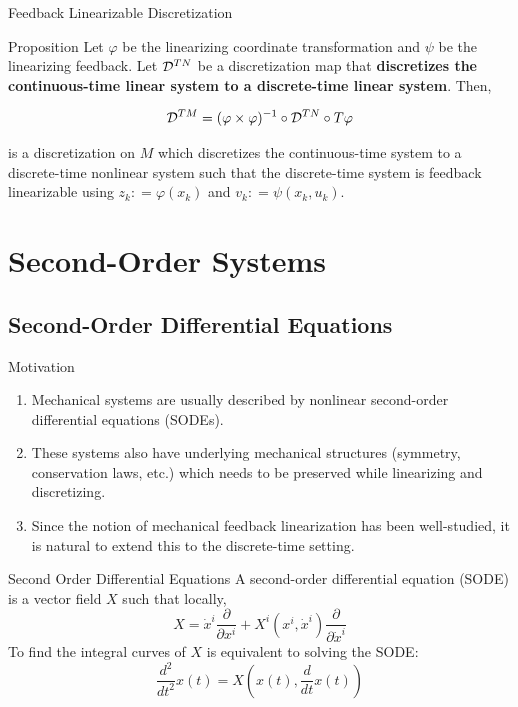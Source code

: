 \documentclass{beamer}
\begin{document}
\begin{frame}{Feedback Linearizable Discretization}
  \begin{block}{Proposition}
    Let $\varphi$ be the linearizing coordinate transformation and $\psi$ be the linearizing feedback. Let $\mathcal{D}^{TN}$ be a discretization map that \textbf{discretizes the continuous-time linear system to a discrete-time linear system}. Then,

    \[
      \mathcal{D}^{TM} = (\varphi \times \varphi)^{-1} \circ \mathcal{D}^{TN} \circ T \varphi
    \]

    is a discretization on $M$ which discretizes the continuous-time system to a discrete-time nonlinear system such that the discrete-time system is feedback linearizable using $z_k : = \varphi(x_k)$ and $v_k : = \psi(x_k, u_k)$.
  \end{block}
  
\end{frame}

\section{Second-Order Systems}

\subsection{Second-Order Differential Equations}

\begin{frame}{Motivation}
  \begin{enumerate}
    \item Mechanical systems are usually described by nonlinear second-order differential equations (SODEs).
    \item These systems also have underlying mechanical structures (symmetry, conservation laws, etc.) which needs to be preserved while linearizing and discretizing.
    \item Since the notion of mechanical feedback linearization has been well-studied, it is natural to extend this to the discrete-time setting.
  \end{enumerate}
\end{frame}

\begin{frame}{Second Order Differential Equations}
  A second-order differential equation (SODE) is a vector field $X$ such that locally,
  \begin{equation}
      X = \dot{x}^i \frac{\partial}{\partial x^i} + X^i(x^i, \dot{x}^i) \frac{\partial}{\partial \dot{x}^i}
  \end{equation}
  To find the integral curves of $X$ is equivalent to solving the SODE:
  \begin{equation}
  \label{eq:sode}
      \frac{d^2}{dt^2}x(t) = X \left( x(t), \frac{d}{dt}x(t) \right) 
  \end{equation}

\end{frame}
\end{document}
